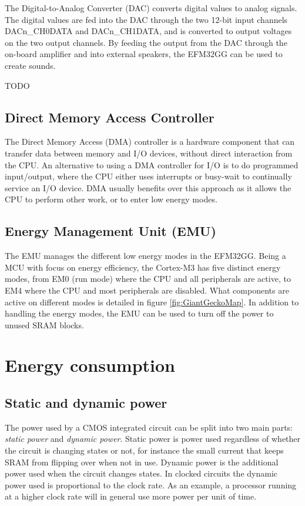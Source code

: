 The Digital-to-Analog Converter (DAC) converts digital values to analog signals. The digital values are fed into the DAC through the two 12-bit input channels DACn\_CH0DATA and DACn\_CH1DATA, and is converted to output voltages on the two output channels. By feeding the output from the DAC through the on-board amplifier and into external speakers, the EFM32GG can be used to create sounds.

TODO %


\subsection{Direct Memory Access Controller}
The Direct Memory Access (DMA) controller is a hardware component that can transfer data between memory and I/O devices, without direct interaction from the CPU. An alternative to using a DMA controller for I/O is to do programmed input/output, where the CPU either uses interrupts or busy-wait to continually service an I/O device. DMA usually benefits over this approach as it allows the CPU to perform other work, or to enter low energy modes.


\subsection{Energy Management Unit (EMU)}\label{subsec:emu}
The EMU manages the different low energy modes in the EFM32GG. Being a MCU with focus on energy efficiency, the Cortex-M3 has five distinct energy modes, from EM0 (run mode) where the CPU and all peripherals are active, to EM4 where the CPU and most peripherals are disabled. What components are active on different modes is detailed in figure \ref{fig:GiantGeckoMap}. In addition to handling the energy modes, the EMU can be used to turn off the power to unused SRAM blocks.\cite{efm32gg-rm}


\section{Energy consumption}

\subsection{Static and dynamic power}
The power used by a CMOS integrated circuit can be split into two main parts: \emph{static power} and \emph{dynamic power}. Static power is power used regardless of whether the circuit is changing states or not, for instance the small current that keeps SRAM from flipping over when not in use. Dynamic power is the additional power used when the circuit changes states. In clocked circuits the dynamic power used is proportional to the clock rate. As an example, a processor running at a higher clock rate will in general use more power per unit of time.\cite{efm32-energy-optimization}

